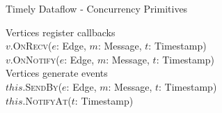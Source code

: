 \begin{frame}[t]{Timely Dataflow - Concurrency Primitives}

  \vspace{0.5cm}
  \begin{center}
  \end{center}

  \vspace{0.5cm}
  Vertices register callbacks \\
  \vspace{0.25cm}
  $v$.\textsc{OnRecv}($e$: Edge, $m$: Message, $t$: Timestamp) \\
  $v$.\textsc{OnNotify}($e$: Edge, $m$: Message, $t$: Timestamp) \\

  \vspace{0.75cm}
  Vertices generate events \\
  \vspace{0.25cm}
  $this$.\textsc{SendBy}($e$: Edge, $m$: Message, $t$: Timestamp) \\
  $this$.\textsc{NotifyAt}($t$: Timestamp) \\

\end{frame}

